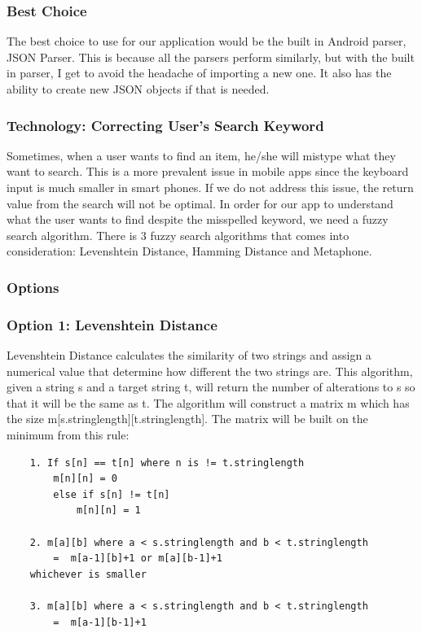 \documentclass[journal,compsoc, 10pt, draftclsnofoot, onecolumn]{IEEEtran}
\begin{document}
\subsubsection*{Best Choice}
The best choice to use for our application would be the built in Android parser,
JSON Parser. This is because all the parsers perform similarly, but with the
built in parser, I get to avoid the headache of importing a new one. It also has
the ability to create new JSON objects if that is needed.

\subsubsection{Technology: Correcting User's Search Keyword}
Sometimes, when a user wants to find an item, he/she will mistype what they want to
search. This is a more prevalent issue in mobile apps since the keyboard input is
much smaller in smart phones. If we do not address this issue, the return value from
the search will not be optimal. In order for our app to understand what the user
wants to find despite the misspelled keyword, we need a fuzzy search algorithm.
There is 3 fuzzy search algorithms that comes into consideration: Levenshtein
Distance, Hamming Distance and Metaphone.

\subsubsection*{Options}
\subsubsection*{Option 1: Levenshtein Distance}
Levenshtein Distance calculates the similarity of two strings and assign a numerical
value that determine how different the two strings are. This algorithm, given a
string s and a target string t, will return the number of alterations to s so that it
will be the same as t. The algorithm will construct a matrix m which has the size
m[s.stringlength][t.stringlength]. The matrix will be built on the minimum from this
rule:

\begin{lstlisting}
	1. If s[n] == t[n] where n is != t.stringlength 
		m[n][n] = 0 
		else if s[n] != t[n] 
			m[n][n] = 1
	
	2. m[a][b] where a < s.stringlength and b < t.stringlength 
		=  m[a-1][b]+1 or m[a][b-1]+1 
	whichever is smaller
	
	3. m[a][b] where a < s.stringlength and b < t.stringlength 
		=  m[a-1][b-1]+1
\end{lstlisting}
\end{document}
